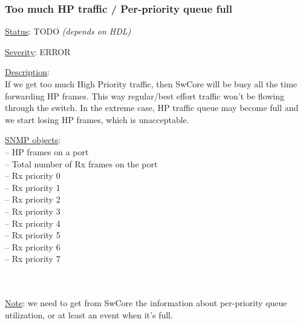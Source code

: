 \subsubsection{\bf Too much HP traffic / Per-priority queue full}
		\label{fail:data:too_much_HP}
		\begin{pck_descr}
			\item [] \underline{Status}: TODO \emph{(depends on HDL)}
			\item [] \underline{Severity}: ERROR
			\item [] \underline{Description}:\\
				If we get too much High Priority traffic, then SwCore will be busy all
				the time forwarding HP frames. This way regular/best effort traffic
				won't be flowing through the switch. In the extreme case, HP traffic
				queue may become full and we start losing HP frames, which is
				unacceptable.
			\item [] \underline{SNMP objects}:\\
        {\footnotesize
				 -- HP frames on a port\\
				 -- Total number of Rx frames on the port\\
				 -- Rx priority 0\\
				 -- Rx priority 1\\
				 -- Rx priority 2\\
				 -- Rx priority 3\\
				 -- Rx priority 4\\
				 -- Rx priority 5\\
				 -- Rx priority 6\\
				 -- Rx priority 7\\
				\\
				\\
         }
			\item [] \underline{Note}: we need to get from SwCore the information
				about per-priority queue utilization, or at least an event when it's
				full.
		\end{pck_descr}

